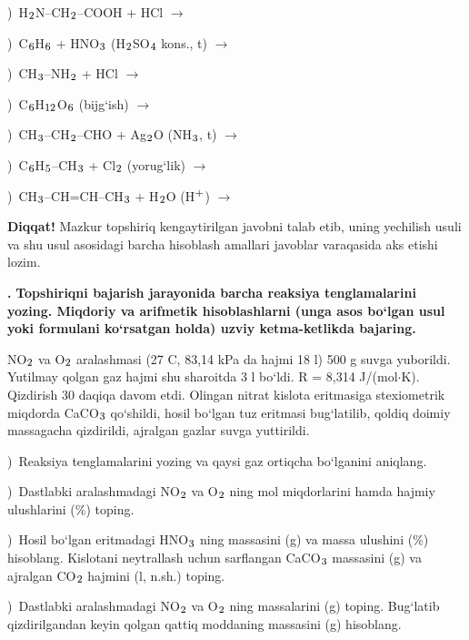 \documentclass[11pt,a4paper]{article}
\renewcommand{\textsubscript}[1]{\ensuremath{_{\text{\fontsize{8}{8}\selectfont #1}}}}
\renewcommand{\textsuperscript}[1]{\ensuremath{^{\text{\fontsize{8}{8}\selectfont #1}}}}
\newcommand{\qn}[1]{\textbf{\fontsize{11.5}{13}\selectfont #1}}
\newcommand{\qsep}{\par\vspace{13pt}}
\newcommand{\diqqat}[1]{\par\smallskip\noindent\textbf{Diqqat!} #1\par\medskip}
\begin{document}
)\ H\textsubscript{2}N--CH\textsubscript{2}--COOH + HCl $\to$\par
{})\ C\textsubscript{6}H\textsubscript{6} + HNO\textsubscript{3} (H\textsubscript{2}SO\textsubscript{4} kons., t) $\to$\par
{})\ CH\textsubscript{3}--NH\textsubscript{2} + HCl $\to$\par
{})\ C\textsubscript{6}H\textsubscript{12}O\textsubscript{6} (bijg`ish) $\to$\par
{})\ CH\textsubscript{3}--CH\textsubscript{2}--CHO + Ag\textsubscript{2}O (NH\textsubscript{3}, t) $\to$\par
{})\ C\textsubscript{6}H\textsubscript{5}--CH\textsubscript{3} + Cl\textsubscript{2} (yorug`lik) $\to$\par
{})\ CH\textsubscript{3}--CH=CH--CH\textsubscript{3} + H\textsubscript{2}O (H\textsuperscript{+}) $\to$\par
\diqqat{Mazkur topshiriq kengaytirilgan javobni talab etib, uning yechilish usuli va shu usul asosidagi barcha hisoblash amallari javoblar varaqasida aks etishi lozim.}\qsep
\noindent\qn{43.} \textbf{Topshiriqni bajarish jarayonida barcha reaksiya tenglamalarini yozing. Miqdoriy va arifmetik hisoblashlarni (unga asos bo`lgan usul yoki formulani ko`rsatgan holda) uzviy ketma-ketlikda bajaring.}\par\smallskip
NO\textsubscript{2} va O\textsubscript{2} aralashmasi (27 \textdegree{}C, 83,14 kPa da hajmi 18 l) 500 g suvga yuborildi. Yutilmay qolgan gaz hajmi shu sharoitda 3 l bo`ldi. R = 8,314 J/(mol$\cdot$K). Qizdirish 30 daqiqa davom etdi. Olingan nitrat kislota eritmasiga stexiometrik miqdorda CaCO\textsubscript{3} qo`shildi, hosil bo`lgan tuz eritmasi bug`latilib, qoldiq doimiy massagacha qizdirildi, ajralgan gazlar suvga yuttirildi.\par
{})\ Reaksiya tenglamalarini yozing va qaysi gaz ortiqcha bo`lganini aniqlang.\par
{})\ Dastlabki aralashmadagi NO\textsubscript{2} va O\textsubscript{2} ning mol miqdorlarini hamda hajmiy ulushlarini (\%) toping.\par
{})\ Hosil bo`lgan eritmadagi HNO\textsubscript{3} ning massasini (g) va massa ulushini (\%) hisoblang. Kislotani neytrallash uchun sarflangan CaCO\textsubscript{3} massasini (g) va ajralgan CO\textsubscript{2} hajmini (l, n.sh.) toping.\par
{})\ Dastlabki aralashmadagi NO\textsubscript{2} va O\textsubscript{2} ning massalarini (g) toping. Bug`latib qizdirilgandan keyin qolgan qattiq moddaning massasini (g) hisoblang.\par
\end{document}
